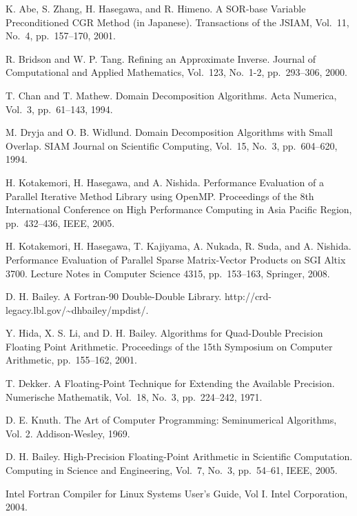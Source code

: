 \documentclass[a4paper]{jarticle}
\begin{document}
{\begin{thebibliography}{10}
K. Abe, S. Zhang, H. Hasegawa, and R. Himeno.
\newblock A SOR-base Variable Preconditioned CGR Method (in Japanese).
\newblock Transactions of the JSIAM,  Vol.~11, No.~4, pp.\ 157--170, 2001.

R. Bridson and W. P. Tang.
\newblock Refining an Approximate Inverse.
\newblock Journal of Computational and Applied Mathematics, Vol.~123, No.~1-2, pp.\ 293--306, 2000. 

T. Chan and T. Mathew.
\newblock Domain Decomposition Algorithms.
\newblock Acta Numerica, Vol.~3, pp.\ 61--143, 1994. 

M. Dryja and O. B. Widlund.
\newblock Domain Decomposition Algorithms with Small Overlap.
\newblock SIAM Journal on Scientific Computing, Vol.~15, No.~3, pp.\ 604--620, 1994.

H. Kotakemori, H. Hasegawa, and A. Nishida.
\newblock Performance Evaluation of a Parallel Iterative Method Library using OpenMP.
\newblock Proceedings of the 8th International Conference on High
	Performance Computing in Asia Pacific Region, pp.\ 432--436, IEEE, 2005.

H. Kotakemori, H. Hasegawa, T. Kajiyama, A. Nukada, R. Suda, and A. Nishida.
\newblock Performance Evaluation of Parallel Sparse Matrix-Vector Products on SGI Altix 3700.
\newblock Lecture Notes in Computer Science 4315, pp.\ 153--163, Springer, 2008.

D. H. Bailey.
\newblock A Fortran-90 Double-Double Library.
\newblock http://crd-legacy.lbl.gov/\textasciitilde dhbailey/mpdist/.

Y. Hida, X. S. Li, and D. H. Bailey.
\newblock Algorithms for Quad-Double Precision Floating Point Arithmetic.
\newblock Proceedings of the 15th Symposium on Computer Arithmetic, pp.\ 155--162, 2001.

T. Dekker.
\newblock A Floating-Point Technique for Extending the Available Precision.
\newblock Numerische Mathematik, Vol.~18, No.~3, pp.\ 224--242, 1971.

D. E. Knuth. 
The Art of Computer Programming: Seminumerical Algorithms, Vol. 2.
Addison-Wesley, 1969.

D. H. Bailey.
\newblock High-Precision Floating-Point Arithmetic in Scientific Computation.
\newblock Computing in Science and Engineering, Vol.~7, No.~3, pp.\ 54--61, IEEE, 2005.

\newblock Intel Fortran Compiler for Linux Systems User's Guide, Vol I.
\newblock Intel Corporation, 2004.


\end{thebibliography}}
\end{document}
